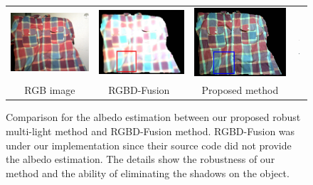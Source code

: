 \begin{figure}[!ht]
\centering
\setlength{\tabcolsep}{0.2em} %
 {\renewcommand{\arraystretch}{0.9}%
\begin{tabular}{c| c c c}
   \includegraphics[height = 0.21\linewidth]{figures/methodology/robust_rgb_shirt.pdf}&
   \includegraphics[height = 0.21\linewidth]{figures/methodology/rgbd_rho_shirt.pdf} &
   \includegraphics[height = 0.21\linewidth]{figures/methodology/robust_rho_shirt.pdf}&
   \parbox[b]{1.5cm}{\includegraphics[width=0.105\textwidth]{figures/methodology/rgbd_rho_shirt_crop.png}\\
   \includegraphics[width=0.105\textwidth]{figures/methodology/robust_rho_shirt_crop.png}}
        
    \\
   {RGB image} & {RGBD-Fusion~\cite{or2015rgbd}} & {Proposed method}&{}\\
 \end{tabular}}
\caption{Comparison for the albedo estimation between our proposed robust multi-light method and RGBD-Fusion method. RGBD-Fusion was under our implementation since their source code did not provide the albedo estimation. The details show the robustness of our method and the ability of eliminating the shadows on the object.}
\label{fig:robust_rho_illustrate}
\end{figure}


